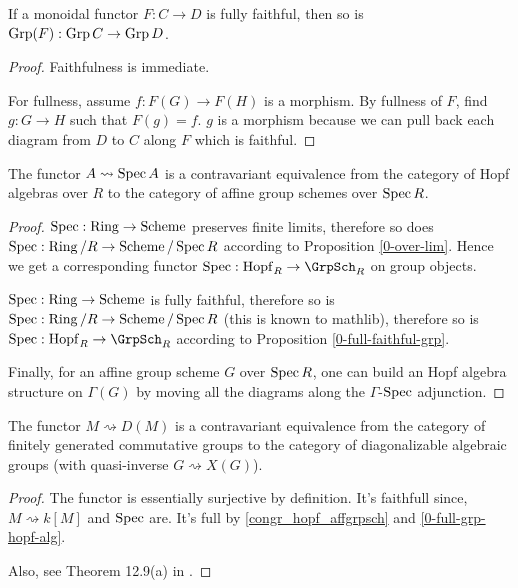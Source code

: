 \begin{proposition}
  \label{0-full-faithful-grp}
  \uses{}

  If a monoidal functor $F : C \to D$ is fully faithful, then so is $\operatorname{Grp}(F) : \operatorname{Grp} C \to \operatorname{Grp} D$.
\end{proposition}
\begin{proof}
  \uses{}

  Faithfulness is immediate.

  For fullness, assume $f : F(G) \to F(H)$ is a morphism. By fullness of $F$, find $g : G \to H$ such that $F(g) = f$. $g$ is a morphism because we can pull back each diagram from $D$ to $C$ along $F$ which is faithful.
\end{proof}


\begin{theorem}
  \label{0-hopf-equiv-aff-grp-sch}
  \uses{}
  \leanok

  The functor $A\rightsquigarrow \operatorname{Spec} A$ is a contravariant equivalence from the category of Hopf algebras over $R$ to the category of affine group schemes over $\operatorname{Spec} R$.
\end{theorem}
\begin{proof}

  $\operatorname{Spec} : \operatorname{Ring} \to \operatorname{Scheme}$ preserves finite limits, therefore so does $\operatorname{Spec} : \operatorname{Ring} / R \to \operatorname{Scheme} / \operatorname{Spec} R$ according to Proposition \ref{0-over-lim}. Hence we get a corresponding functor $\Spec : \Hopf_R \to \GrpSch_R$ on group objects.

  $\operatorname{Spec} : \operatorname{Ring} \to \operatorname{Scheme}$ is fully faithful, therefore so is $\operatorname{Spec} : \operatorname{Ring} / R \to \operatorname{Scheme} / \operatorname{Spec} R$ (this is known to mathlib), therefore so is $\Spec : \Hopf_R \to \GrpSch_R$ according to Proposition \ref{0-full-faithful-grp}.

  Finally, for an affine group scheme $G$ over $\operatorname{Spec} R$, one can build an Hopf algebra structure on $\Gamma(G)$ by moving all the diagrams along the $\Gamma$-$\operatorname{Spec}$ adjunction.
\end{proof}


\begin{theorem}
  \label{0-fg-comm-grp-equiv-diag-grp-sch}
  The functor $M\rightsquigarrow D(M)$ is a contravariant equivalence
  from the category of finitely generated commutative groups to the category of
  diagonalizable algebraic groups (with quasi-inverse $G \rightsquigarrow X(G)$).
\end{theorem}
\begin{proof}

  The functor is essentially surjective by definition.
  It's faithfull since, $M\rightsquigarrow k[M]$ and $\operatorname{Spec}$ are.
  It's full by \ref{congr_hopf_affgrpsch} and \ref{0-full-grp-hopf-alg}.

  Also, see Theorem 12.9(a) in \cite{Milne_2017}.
\end{proof}
